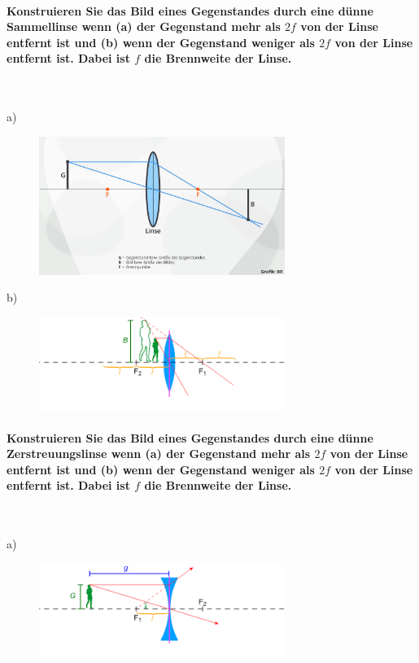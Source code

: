 \documentclass[a4paper, 11pt, ngerman, parskip=half-]{scrartcl}
\begin{document}
\paragraph{Konstruieren Sie das Bild eines Gegenstandes durch eine dünne Sammellinse wenn (a) der
    Gegenstand mehr als $2f$ von der Linse entfernt ist und (b) wenn der Gegenstand weniger als $2f$ von
    der Linse entfernt ist. Dabei ist $f$ die Brennweite der Linse.} ~

a)
\begin{figure}[H]
    \centering
    \includegraphics[width=8cm]{image/17/geo15a}
\end{figure}

b)
\begin{figure}[H]
    \centering
    \includegraphics[width=8cm]{image/17/geo15b}
\end{figure}

\paragraph{Konstruieren Sie das Bild eines Gegenstandes durch eine dünne Zerstreuungslinse wenn (a)
    der Gegenstand mehr als $2f$ von der Linse entfernt ist und (b) wenn der Gegenstand weniger
    als $2f$ von der Linse entfernt ist. Dabei ist $f$ die Brennweite der Linse.} ~

a)
\begin{figure}[H]
    \centering
    \includegraphics[width=8cm]{image/17/geo16a}
\end{figure}
\end{document}
